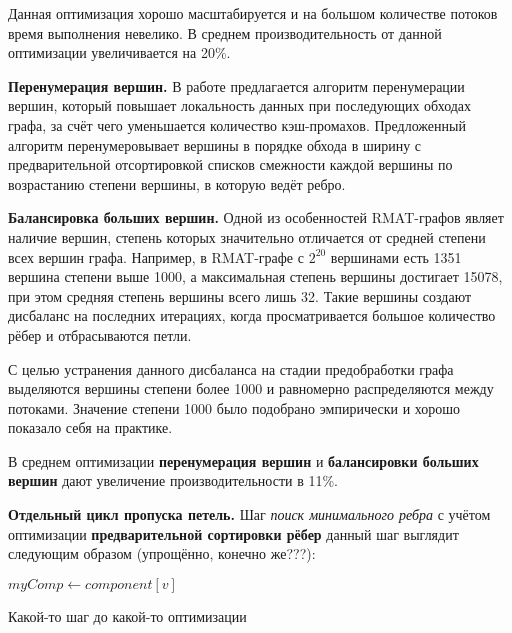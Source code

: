\documentclass[a4paper,10pt]{extarticle}
\begin{document}
Данная оптимизация хорошо масштабируется и на большом количестве потоков время выполнения невелико. В среднем производительность от данной оптимизации увеличивается на 20\%.



\textbf{Перенумерация вершин.}
В работе \cite{sparse-matrix-renum} предлагается алгоритм перенумерации вершин, который повышает локальность данных при последующих обходах графа, за счёт чего уменьшается количество кэш-промахов. %
Предложенный алгоритм перенумеровывает вершины в порядке обхода в ширину с предварительной отсортировкой списков смежности каждой вершины по возрастанию степени вершины, в которую ведёт ребро.


\textbf{Балансировка больших вершин.}
Одной из особенностей RMAT-графов являет наличие вершин, степень которых значительно отличается от средней степени всех вершин графа. Например, в RMAT-графе с $2^{20}$ вершинами есть 1351 вершина степени выше 1000, а максимальная степень вершины достигает 15078, при этом средняя степень вершины всего лишь 32. Такие вершины создают дисбаланс на последних итерациях, когда просматривается большое количество рёбер и отбрасываются петли.

С целью устранения данного дисбаланса на стадии предобработки графа выделяются вершины степени более 1000 и равномерно распределяются между потоками. Значение степени 1000 было подобрано эмпирически и хорошо показало себя на практике.

В среднем оптимизации \textbf{перенумерация вершин} и \textbf{балансировки больших вершин} дают увеличение производительности в 11\%.



\textbf{Отдельный цикл пропуска петель.}
Шаг \textit{поиск минимального ребра} с учётом оптимизации \textbf{предварительной сортировки рёбер} данный шаг выглядит следующим образом (упрощённо, конечно же???):

\begin{algorithm}
    \SetAlgoLined
    $myComp \gets component[v]$\;
    \caption{Какой-то шаг до какой-то оптимизации}
\end{algorithm}
\end{document}
